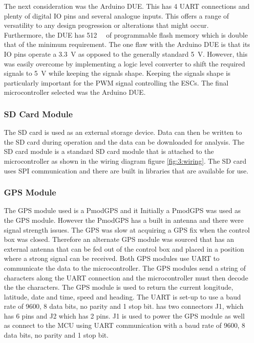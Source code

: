 		The next consideration was the Arduino DUE. This has 4 UART connections and plenty of digital IO pins and several analogue inputs. This offers a range of versatility to any design progression or alterations that might occur. Furthermore, the DUE has \SI{512}{\kilo\byte} of programmable flash memory which is double that of the minimum requirement. The one flaw with the Arduino DUE is that its IO pins operate a \SI{3.3}{\volt} as opposed to the generally standard \SI{5}{\volt}. However, this was easily overcome by implementing a logic level converter to shift the required signals to \SI{5}{\volt} while keeping the signals shape. Keeping the signals shape is particularly important for the PWM signal controlling the ESCs. The final microcontroller selected was the Arduino DUE.
		\subsubsection{SD Card Module}
		The SD card is used as an external storage device. Data can then be written to the SD card during operation and the data can be downloaded for analysis. The SD card module is a standard SD card module that is attached to the microcontroller as shown in the wiring diagram figure \ref{fig:3:wiring}. The SD card uses SPI communication and there are built in libraries that are available for use.
		\subsubsection{GPS Module}
		The GPS module used is a PmodGPS and it
		Initially a PmodGPS was used as the GPS module. However the PmodGPS has a built in antenna and there were signal strength issues. The GPS was slow at acquiring a GPS fix when the control box was closed. Therefore an alternate GPS module was sourced that has an external antenna that can be fed out of the control box and placed in a position where a strong signal can be received. Both GPS modules use UART to communicate the data to the microcontroller. The GPS modules send a string of characters along the UART connection and the microcontroller must then decode the the characters. The GPS module is used to return the current longitude, latitude, date and time, speed and heading. The UART is set-up to use a baud rate of 9600, 8 data bits, no parity and 1 stop bit.   
		has two connectors J1, which has 6 pins and J2 which has 2 pins. J1 is used to power the GPS module as well as connect to the MCU using UART communication with a baud rate of 9600, 8 data bits, no parity and 1 stop bit. 
		
